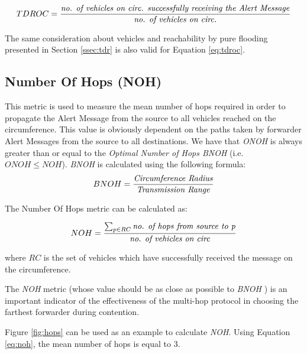 			\begin{gather}
			 	\label{eq:tdroc}
			 	TDROC = \frac{\textrm{\textit{no. of vehicles on circ. successfully receiving the Alert Message}}}{\textrm{\textit{no. of vehicles on circ.}}}
			\end{gather}
		
			The same consideration about vehicles and reachability by pure flooding presented in Section \ref{ssec:tdr} is also valid for Equation \ref{eq:tdroc}.
			
		\subsection{Number Of Hops (NOH)}
			This metric is used to measure the mean number of hops required in order to propagate the Alert Message from the source to all vehicles reached on the circumference. This value is obviously dependent on the paths taken by forwarder Alert Messages from the source to all destinations. We have that \textit{ONOH} is always greater than or equal to the \textit{Optimal Number of Hops BNOH} (i.e. $ONOH \leq NOH$). \textit{BNOH} is calculated using the following formula:
			$$ BNOH = \frac{\textrm{\textit{Circumference Radius}}}{\textrm{\textit{Transmission Range}}} $$
			
			The Number Of Hops metric can be calculated as:
			
			\begin{gather}
				\label{eq:noh}
				NOH = \frac{ \sum_{p \in RC } \textrm{\textit{no. of hops from source to p}}} {\textrm{\textit{no. of vehicles on circ}}}
			\end{gather}
			
			where $RC$ is the set of vehicles which have successfully received the message on the circumference.
			
			
			The \textit{NOH} metric (whose value should be as close as possible to \textit{BNOH} ) is an important indicator of the effectiveness of the multi-hop protocol in choosing the farthest forwarder during contention.
			
			
			Figure \ref{fig:hops} can be used as an example to calculate \textit{NOH}. Using Equation \ref{eq:noh}, the mean number of hops is equal to 3.
			
